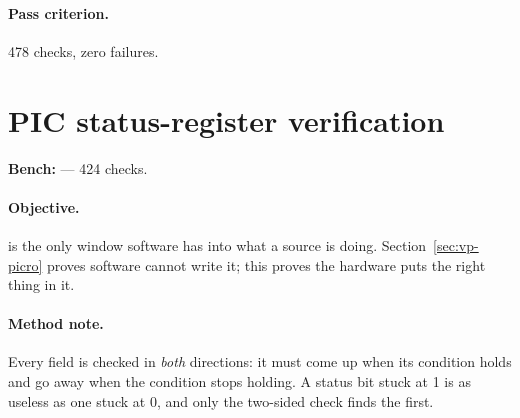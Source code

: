 \paragraph{Pass criterion.} 478 checks, zero failures.

\section{PIC status-register verification}
\label{sec:vp-picstatus}

\textbf{Bench:}  --- 424 checks.

\paragraph{Objective.}  is the only window software has into
what a source is doing. Section~\ref{sec:vp-picro} proves software cannot write
it; this proves the hardware puts the right thing in it.

\paragraph{Method note.} Every field is checked in \emph{both} directions: it
must come up when its condition holds and go away when the condition stops
holding. A status bit stuck at 1 is as useless as one stuck at 0, and only the
two-sided check finds the first.

